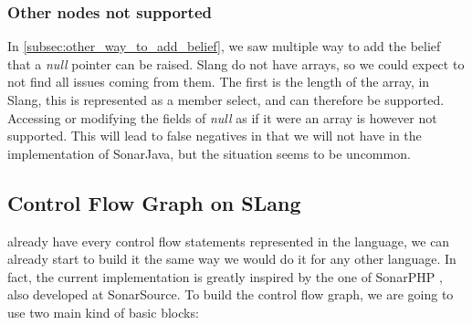 \subsubsection{Other nodes not supported}
\label{subsubsec:other_nodes_not_supported}

In \ref{subsec:other_way_to_add_belief}, we saw multiple way to add the belief that a \emph{null} pointer can be raised. 
Slang do not have arrays, so we could expect to not find all issues coming from them. 
The first is the length of the array, in Slang, this is represented as a member select, and can therefore be supported.
Accessing or modifying the fields of \emph{null} as if it were an array is however not supported. 
This will lead to false negatives in \slang{} that we will not have in the implementation of SonarJava, but the situation seems to be uncommon.

\subsection{Control Flow Graph on SLang}
\label{subsec:cfg_on_slang}

\slang{} already have every control flow statements represented in the language, we can already start to build it the same way we would do it for any other language. 
In fact, the current implementation is greatly inspired by the one of SonarPHP \cite{SonarPHP:2019:Online}, also developed at SonarSource.
To build the control flow graph, we are going to use two main kind of basic blocks:

